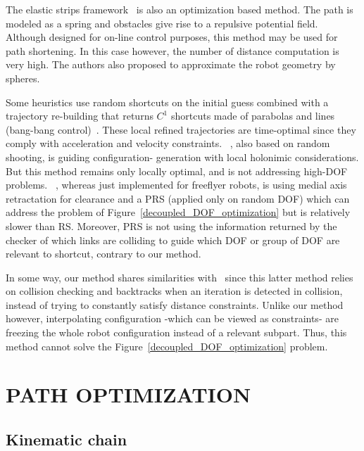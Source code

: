 \documentclass{tADR2e}
\begin{document}
The elastic strips framework~\cite{BrockElasticStrips} is also an optimization 
based method. The path is modeled as a spring and obstacles give rise to a 
repulsive potential field. Although designed for on-line control purposes, this 
method may be used for path shortening. In this case however, the number of 
distance computation is very high. The authors also proposed to approximate the 
robot geometry by spheres.

Some heuristics use random shortcuts on the initial guess combined with a 
trajectory re-building that returns ${C}^1$ shortcuts made of parabolas and lines 
(bang-bang control)~\cite{HauserFastSmooth}. These local refined trajectories 
are time-optimal since they comply with acceleration and velocity constraints. 
~\cite{Guernane2011}, also based on random shooting, is guiding configuration-
generation with local holonimic considerations. But this method remains only locally 
optimal, and is not addressing high-DOF problems.
~\cite{Geraerts04clearancebased}, whereas just implemented for freeflyer robots, is 
using medial axis retractation for clearance and a PRS (applied only on random DOF) 
which can address the problem of Figure~\ref{decoupled_DOF_optimization} but is 
relatively slower than RS. Moreover, PRS is not using the information returned by 
the checker of which links are colliding to guide which DOF or group of DOF are 
relevant to shortcut, contrary to our method.

In some way, our method shares similarities with~\cite{PanSmoothSplineShort} 
since this latter method relies on collision checking and backtracks when an 
iteration is detected in collision, instead of trying to constantly satisfy 
distance constraints. Unlike our method however, interpolating configuration -which 
can be viewed as constraints- are freezing the whole robot configuration instead of 
a relevant subpart. Thus, this method cannot solve the 
Figure~\ref{decoupled_DOF_optimization} problem.




\section{PATH OPTIMIZATION} \label{section:path_optim}

\subsection {Kinematic chain}
\end{document}
